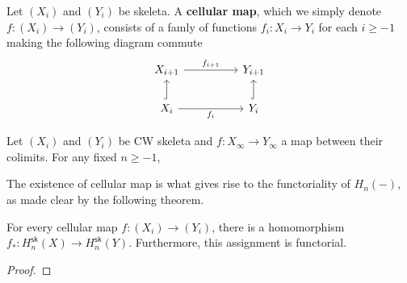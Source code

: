 \documentclass[a4page]{article}
\begin{document}
\begin{definition}
  Let $(X_i)$ and $(Y_i)$ be skeleta. A \textbf{cellular map}, which we simply denote $f : (X_i) \to (Y_i)$, consists of a famly of functions $f_i : X_i \to Y_i$ for each $i \geq -1$ making the following diagram commute
  \[
\begin{tikzcd}[ampersand replacement=\&]
	{X_{i+1}} \&\& {Y_{i+1}} \\
	{X_i} \&\& {Y_i}
	\arrow["{f_{i+1}}", from=1-1, to=1-3]
	\arrow["{f_{i}}"', from=2-1, to=2-3]
	\arrow[hook, from=2-1, to=1-1]
	\arrow[hook, from=2-3, to=1-3]
\end{tikzcd}
\]
\end{definition}

\begin{theorem}
  Let $(X_i)$ and $(Y_i)$ be CW skeleta and $f : X_{\infty} \to Y_{\infty}$ a map between their colimits. For any fixed $n \geq -1$, 
\end{theorem}
The existence of cellular map is what gives rise to the functoriality of $H_n(-)$, as made clear by the following theorem.
\begin{proposition}
  For every cellular map $f : (X_i) \to (Y_i)$, there is a homomorphism $f_* : H^{\mathsf{sk}}_n(X) \to H^{\mathsf{sk}}_n(Y)$. Furthermore, this assignment is functorial.
\end{proposition}
\begin{proof}
\end{proof}


\printbibliography
\end{document}
